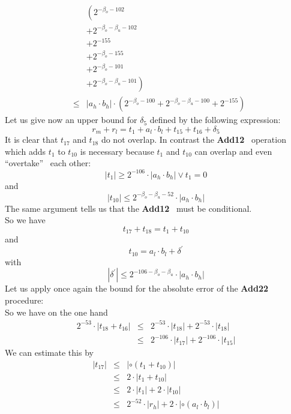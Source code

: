 \documentclass[a4paper,10pt,twoside]{article}
\newenvironment{proof}[1][Proof]{\begin{trivlist}
\item[\hskip \labelsep {\bfseries #1}]}{\end{trivlist}}
\newcommand{\hi}{\ensuremath{\mathit{h}}}
\newcommand{\mi}{\ensuremath{\mathit{m}}}
\newcommand{\lo}{\ensuremath{\mathit{l}}}
\newcommand{\ouvguill}{``}
\newcommand{\fermguill}{''}
\newcommand{\Add}{{\bf Add12}}
\newcommand{\AddDD}{{\bf Add22}}
\begin{document}
\begin{proof}
\begin{eqnarray*}
& & \left( 2^{-\beta_o-102} \right. \\
& & + 2^{-\beta_o-\beta_u-102} \\
& & + 2^{-155} \\
& & + 2^{-\beta_o-155} \\
& & + 2^{-\beta_o-101} \\
& & \left. + 2^{-\beta_o-\beta_u-101} \right) \\
& \leq & \left \vert a_\hi \cdot b_\hi \right \vert \cdot \left( 2^{-\beta_o-100} + 2^{-\beta_o-\beta_u-100} + 2^{-155} \right)
\end{eqnarray*}
Let us give now an upper bound for $\delta_5$ defined by the following expression:
$$r_\mi + r_\lo = t_1 + a_\lo \cdot b_\lo + t_{15} + t_{16} + \delta_5$$
It is clear that $t_{17}$ and $t_{18}$ do not overlap. In contrast the \Add~ operation which adds $t_1$ to $t_{10}$ is
necessary because $t_1$ and $t_{10}$ can overlap and even \ouvguill overtake\fermguill~ each other:
$$\left \vert t_1 \right \vert \geq 2^{-106} \cdot \left \vert a_\hi \cdot b_\hi \right \vert \lor t_1 = 0$$
and
$$\left \vert t_{10} \right \vert \leq 2^{-\beta_o-\beta_u-52} \cdot \left \vert a_\hi \cdot b_\hi \right \vert$$
The same argument tells us that the \Add~ must be conditional. \\
So we have
$$t_{17} + t_{18} = t_1 + t_{10}$$
and
$$t_{10} = a_\lo \cdot b_\lo + \delta^\prime$$
with
$$\left \vert \delta^\prime \right \vert \leq 2^{-106-\beta_o-\beta_u} \cdot \left \vert a_\hi \cdot b_\hi \right \vert$$
Let us apply once again the bound for the absolute error of the \AddDD~ procedure:\\
So we have on the one hand
\begin{eqnarray*}
2^{-53} \cdot \left \vert t_{18} + t_{16} \right \vert & \leq &
2^{-53} \cdot \left \vert t_{18} \right \vert + 2^{-53} \cdot \left \vert t_{18} \right \vert \\
& \leq & 2^{-106} \cdot \left \vert t_{17} \right \vert + 2^{-106} \cdot \left \vert t_{15} \right \vert
\end{eqnarray*}
We can estimate this by
\begin{eqnarray*}
\left \vert t_{17} \right \vert & \leq & \left \vert \circ \left( t_1 + t_{10} \right) \right \vert \\
& \leq & 2 \cdot \left \vert t_1 + t_{10} \right \vert \\
& \leq & 2 \cdot \left \vert t_1 \right \vert + 2 \cdot \left \vert t_{10} \right \vert \\
& \leq & 2^{-52} \cdot \left \vert r_\hi \right \vert + 2 \cdot \left \vert \circ \left( a_\lo \cdot b_\lo \right) \right \vert \\

\end{eqnarray*}
\end{proof}
\end{document}
